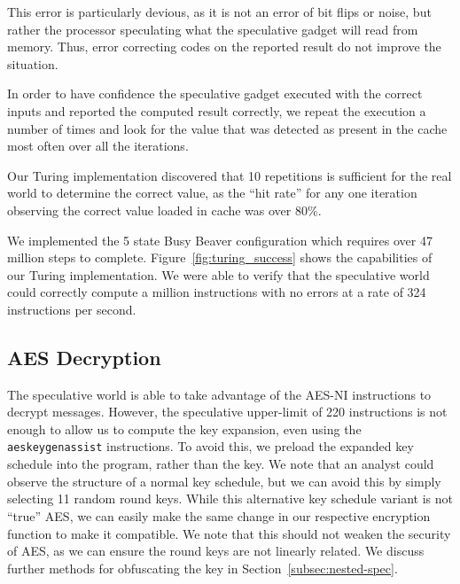 This error is particularly devious, as it is not an
error of bit flips or noise, but rather the processor speculating what the
speculative gadget will read from memory. Thus, error correcting codes on
the reported result do not improve the situation.



In order to have confidence the speculative gadget executed with the
correct inputs and reported the computed result correctly, 
we repeat the execution a number of times and look for the value that was
detected as present in the cache most often over all the iterations.

Our Turing implementation discovered that 10 repetitions is sufficient for the
real world to determine the correct value, as the ``hit rate'' for any one
iteration observing the correct value loaded in cache was over 80\%.

We implemented the 5 state Busy Beaver configuration which requires over 47
million steps to complete. Figure~\ref{fig:turing_success} shows the
capabilities of our Turing implementation. We were able to verify that the
speculative world could correctly compute a million instructions with no errors
at a rate of 324 instructions per second.



\subsection{AES Decryption}
\label{subsec:impl-aes}
The speculative world is able to take advantage of the AES-NI instructions to
decrypt messages. However, the speculative upper-limit of 220 instructions is not
enough to allow us to compute the key expansion, even using the
\texttt{aeskeygenassist} instructions. To avoid this, we preload the expanded
key schedule into the program, rather than the key. We note that an analyst
could observe the structure of a normal key schedule,
but we can avoid this by simply selecting 11 random round keys.
While this alternative key schedule variant is not ``true'' AES, we can easily
make the same change in our respective encryption function to make it compatible.
We note that
this should not weaken the security of AES, as we can ensure the round keys are
not linearly related.
We discuss further methods for obfuscating
the key in Section~\ref{subsec:nested-spec}.


